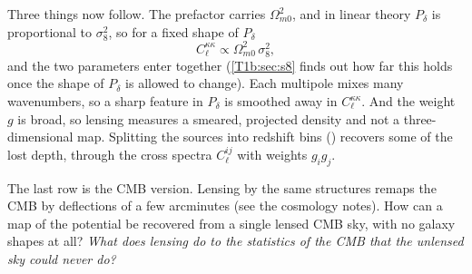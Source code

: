 Three things now follow. The prefactor carries $\Omega_{m0}^2$, and in linear theory $P_\delta$ is proportional to $\sigma_8^2$, so for a fixed shape of $P_\delta$
\begin{equation}
C_\ell^{\kappa\kappa}\propto\Omega_{m0}^2\,\sigma_8^2 ,
\label{T1b:eq:cl-scaling}
\end{equation}
and the two parameters enter together (\cref{T1b:sec:s8} finds out how far this holds once the shape of $P_\delta$ is allowed to change). Each multipole mixes many wavenumbers, so a sharp feature in $P_\delta$ is smoothed away in $C_\ell^{\kappa\kappa}$. And the weight $g$ is broad, so lensing measures a smeared, projected density and not a three-dimensional map. Splitting the sources into redshift bins () recovers some of the lost depth, through the cross spectra $C_\ell^{ij}$ with weights $g_ig_j$.

The last row is the CMB version. Lensing by the same structures remaps the CMB by deflections of a few arcminutes (see the cosmology notes). How can a map of the potential be recovered from a single lensed CMB sky, with no galaxy shapes at all? \emph{What does lensing do to the statistics of the CMB that the unlensed sky could never do?}

